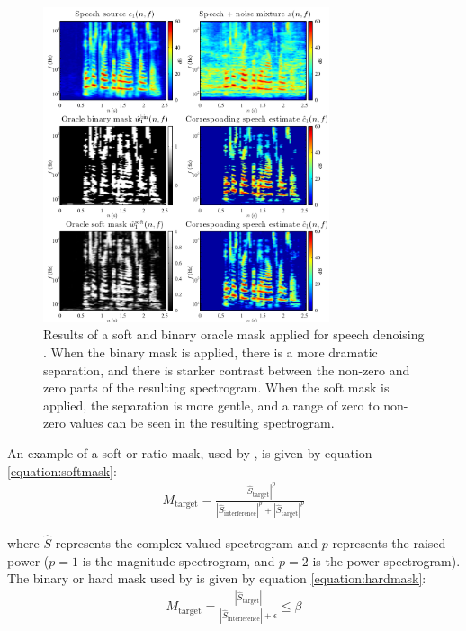 \documentclass[report.tex]{subfiles}
\begin{document}
\begin{figure}[ht]
	\centering
	\includegraphics[width=0.7500\textwidth]{./images-mss/maskdemo.png}
	\caption{Results of a soft and binary oracle mask applied for speech denoising \parencite[71]{masking}. When the binary mask is applied, there is a more dramatic separation, and there is starker contrast between the non-zero and zero parts of the resulting spectrogram. When the soft mask is applied, the separation is more gentle, and a range of zero to non-zero values can be seen in the resulting spectrogram.}
	\label{fig:masks}
\end{figure}

An example of a soft or ratio mask, used by \textcite{fitzgerald1, fitzgerald2}, is given by equation \eqref{equation:softmask}:
\begin{align}
	M_{\text{target}} = \frac{|\hat{S}_{\text{target}}|^{p}}{|\hat{S}_{\text{interference}}|^{p} + |\hat{S}_{\text{target}}|^{p}}\tag{21}\label{equation:softmask}
\end{align}

where $\hat{S}$ represents the complex-valued spectrogram and $p$ represents the raised power ($p = 1$ is the magnitude spectrogram, and $p = 2$ is the power spectrogram). The binary or hard mask used by \textcite{driedger} is given by equation \eqref{equation:hardmask}:
\begin{align}
	M_{\text{target}} = \frac{|\hat{S}_{\text{target}}|}{|\hat{S}_{\text{interference}}| + \epsilon} \le \beta\tag{22}\label{equation:hardmask}
\end{align}
\end{document}
